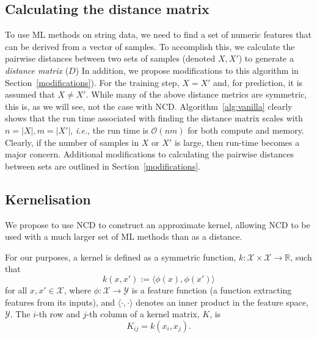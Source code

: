 \documentclass[preprint,12pt]{article}
\begin{document}
\subsection{Calculating the distance matrix}
\label{distance_matrix}
\label{alg:vanilla}
To use ML methods on string data, we need to find a set of numeric features that can be derived from a vector of samples.
To accomplish this, we calculate the pairwise distances between two sets of samples (denoted $X, X'$) to generate a \textit{distance matrix} ($D$) 
In addition, we propose modifications to this algorithm in Section~\ref{modifications}).
For the training step, $X = X'$ and, for prediction, it is assumed that $X \neq X'$.
While many of the above distance metrics are symmetric, this is, as we will see, not the case with NCD.
Algorithm~\ref{alg:vanilla} clearly shows that the run time associated with finding the distance matrix scales with $n = | X |, m = | X' |$, \textit{i.e.}, the run time is $\mathcal{O}(nm)$ for both compute and memory.
Clearly, if the number of samples in $X$ or $X'$ is large, then run-time becomes a major concern.
Additional modifications to calculating the pairwise distances between sets are outlined in Section~\ref{modifications}.



\subsection{Kernelisation}
\label{kernels}

We propose to use NCD to construct an approximate kernel, allowing NCD to be used with a much larger set of ML methods than as a distance.

For our purposes, a kernel is defined as a symmetric function, $k : \mathcal{X} \times \mathcal{X} \rightarrow \mathbb{R}$, such that
\begin{equation}
    k(x, x') := \langle \phi(x), \phi(x') \rangle 
    \label{eq:kernel}
\end{equation}
for all $x, x' \in \mathcal{X}$,
where $\phi: \mathcal{X} \to \mathcal{Y}$ is a feature function (a function extracting features from its inputs), and $\langle \cdot, \cdot \rangle$ denotes an inner product in the feature space, $\mathcal{Y}$.
The $i$-th row and $j$-th column of a kernel matrix, $K$, is
$$
    K_{ij} = k(x_i, x_j).
$$
\end{document}

